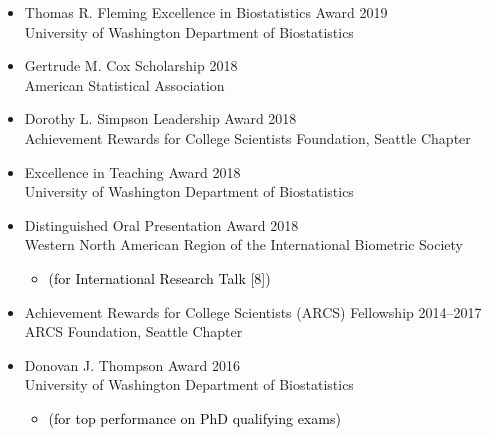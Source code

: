 \documentclass[margin]{res}
\newcommand{\annotateItem}[1]{
	\begin{itemize} \vspace{-0.1cm}
	\item[] 
	\begin{footnotesize}\textcolor{black}{(#1)}\end{footnotesize}
	\end{itemize} \vspace{-0.1cm}
}
\begin{document}
\begin{resume}
\begin{itemize}
\item Thomas R. Fleming Excellence in Biostatistics Award \hfill 2019 \\   
University of Washington Department of Biostatistics

\item Gertrude M. Cox Scholarship \hfill 2018 \\ American Statistical Association

\item Dorothy L. Simpson Leadership Award \hfill 2018 \\ Achievement Rewards for College Scientists Foundation, Seattle Chapter

\item Excellence in Teaching Award  \hfill 2018 \\
University of Washington Department of Biostatistics

\item Distinguished Oral Presentation Award  \hfill 2018 \\ Western North American Region of the International Biometric Society  %
	\annotateItem{for International Research Talk [8]}

\item Achievement Rewards for College Scientists (ARCS) Fellowship \hfill 2014--2017 \\
ARCS Foundation, Seattle Chapter

\item Donovan J. Thompson Award  \hfill 2016 \\
University of Washington Department of Biostatistics %
	\annotateItem{for top performance on PhD qualifying exams}

\end{itemize}



\end{resume}
\end{document}
